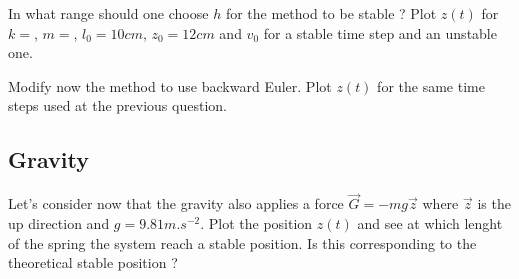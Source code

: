 In what range should one choose $h$ for the method to be stable ?
Plot $z(t)$ for $k = $, $m = $, $l_0 = 10cm$, $z_0 = 12cm$ and $v_0$ for a stable time step and an unstable one.

Modify now the method to use backward Euler. Plot $z(t)$ for the same time steps used at the previous question.

\subsection{Gravity} Let's consider now that the gravity also applies a force $\vec{G} = - m g \vec{z}$ where $\vec{z}$ is the up direction and $g = 9.81m.s^{-2}$. Plot the position $z(t)$ and see at which lenght of the spring the system reach a stable position. Is this corresponding to the theoretical stable position ?
